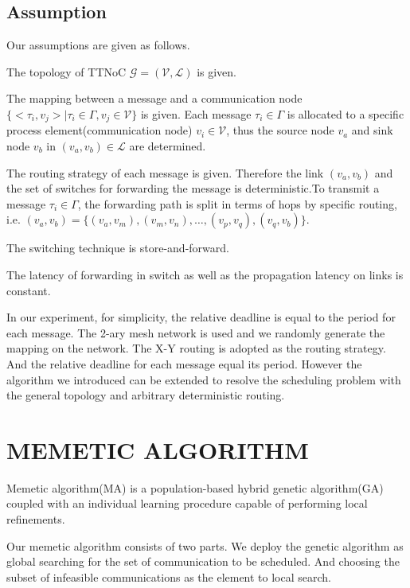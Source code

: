\documentclass[jornal]{IEEEtran}
\begin{document}
\subsection{Assumption}

Our assumptions are given as follows. 

The topology of TTNoC $\mathcal{G}=(\mathcal{V},\mathcal{L})$ is given.

The mapping between a message and a communication node $\{ <\tau_{i} , v_{j}>\mid \tau_{i}\in\Gamma,v_{j}\in\mathcal{V} \}$ is given. Each message $\tau_{i}\in\Gamma$ is allocated to a specific process element(communication node) $v_{i}\in\mathcal{V}$, thus the source node $v_{a}$ and sink node $v_{b}$ in $(v_{a},v_{b})\in \mathcal{L}$ are determined.

The routing strategy of each message is given. Therefore the link $(v_{a},v_{b})$ and the set of switches for forwarding the message is deterministic.To transmit a message $ \tau_{i}\in\Gamma $, the forwarding path is split in terms of hops by specific routing, i.e. $(v_{a},v_{b})=\{(v_{a},v_{m}),(v_{m},v_{n}),\dots,(v_{p},v_{q}),(v_{q},v_{b})\}$. 

The switching technique is store-and-forward.

The latency of forwarding in switch as well as the propagation latency on links is constant.

In our experiment, for simplicity, the relative deadline is equal to the period for each message. The 2-ary mesh network is used and we randomly generate the mapping on the network. The X-Y routing is adopted as the routing strategy. And the relative deadline for each message equal its period. However the algorithm we introduced can be extended to resolve the scheduling problem with the general topology and arbitrary deterministic routing.

\section{MEMETIC ALGORITHM\label{s:algorithm}}

Memetic algorithm(MA) is a population-based hybrid genetic algorithm(GA) coupled with an individual learning procedure capable of performing local refinements\cite{DBLP:journals/cim/OngLC10}. 

Our memetic algorithm consists of two parts. We deploy the genetic algorithm as global searching for the set of communication to be scheduled. And choosing the subset of infeasible communications as the element to local search.
\end{document}
